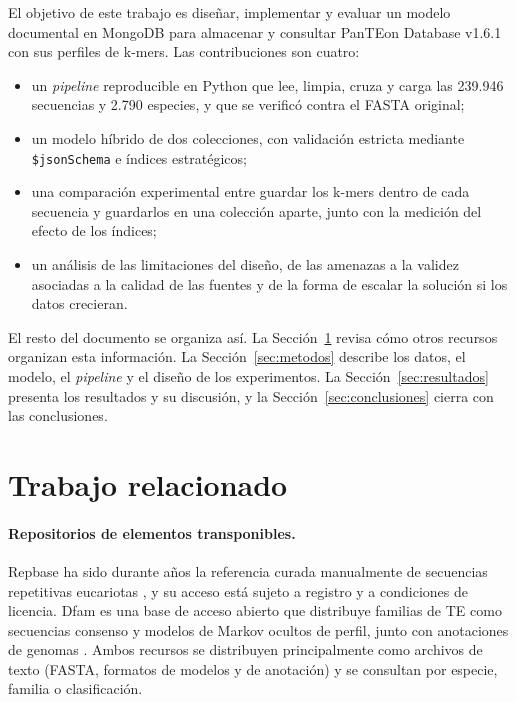 \documentclass[pdflatex,lineno,referee,sn-vancouver-num]{sn-jnl}
\theoremstyle{thmstyleone}%
\theoremstyle{thmstyletwo}%
\theoremstyle{thmstylethree}%
\begin{document}
El objetivo de este trabajo es diseñar, implementar y evaluar un modelo documental en MongoDB para almacenar y consultar PanTEon Database v1.6.1 con sus perfiles de k-mers. Las contribuciones son cuatro:
\begin{itemize}
  \item un \emph{pipeline} reproducible en Python que lee, limpia, cruza y carga las 239.946 secuencias y 2.790 especies, y que se verificó contra el FASTA original;
  \item un modelo híbrido de dos colecciones, con validación estricta mediante \texttt{\$jsonSchema} e índices estratégicos;
  \item una comparación experimental entre guardar los k-mers dentro de cada secuencia y guardarlos en una colección aparte, junto con la medición del efecto de los índices;
  \item un análisis de las limitaciones del diseño, de las amenazas a la validez asociadas a la calidad de las fuentes y de la forma de escalar la solución si los datos crecieran.
\end{itemize}

El resto del documento se organiza así. La Sección~\ref{sec:relacionado} revisa cómo otros recursos organizan esta información. La Sección~\ref{sec:metodos} describe los datos, el modelo, el \emph{pipeline} y el diseño de los experimentos. La Sección~\ref{sec:resultados} presenta los resultados y su discusión, y la Sección~\ref{sec:conclusiones} cierra con las conclusiones.

\section{Trabajo relacionado}\label{sec:relacionado}

\paragraph{Repositorios de elementos transponibles.} Repbase ha sido durante años la referencia curada manualmente de secuencias repetitivas eucariotas \cite{bao2015repbase}, y su acceso está sujeto a registro y a condiciones de licencia. Dfam es una base de acceso abierto que distribuye familias de TE como secuencias consenso y modelos de Markov ocultos de perfil, junto con anotaciones de genomas \cite{storer2021dfam}. Ambos recursos se distribuyen principalmente como archivos de texto (FASTA, formatos de modelos y de anotación) y se consultan por especie, familia o clasificación.
\end{document}
